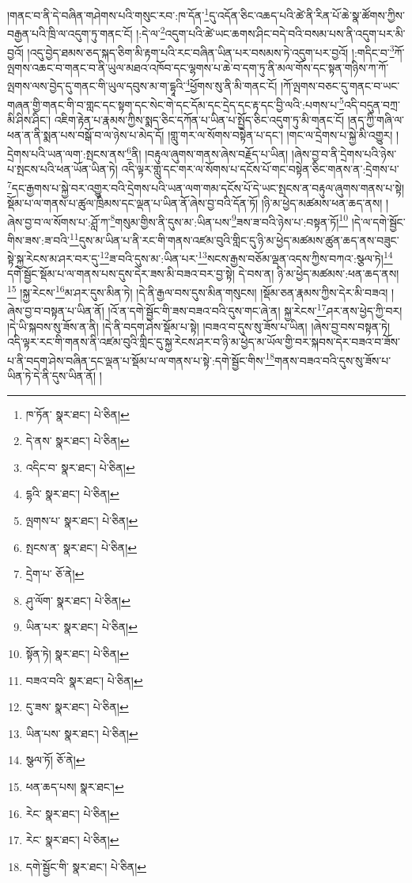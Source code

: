 །གནང་བ་ནི་དེ་བཞིན་གཤེགས་པའི་གསུང་རབ་:ཁ་དོན་\footnote{ཁ་ཏོན་  སྣར་ཐང་།  པེ་ཅིན། }དུ་འདོན་ཅིང་འཆད་པའི་ཚེ་ནི་རིན་པོ་ཆེ་སྣ་ཚོགས་ཀྱིས་བརྒྱན་པའི་ཁྲི་ལ་འདུག་ཏུ་གནང་ངོ། །:དེ་ལ་\footnote{དེ་ནས་  སྣར་ཐང་།  པེ་ཅིན། }འདུག་པའི་ཚེ་ཡང་ཆགས་ཤིང་བདེ་བའི་བསམ་པས་ནི་འདུག་པར་མི་བྱའོ། །འདུ་བྱེད་ཐམས་ཅད་སྐད་ཅིག་མི་རྟག་པའི་རང་བཞིན་ཡིན་པར་བསམས་ཏེ་འདུག་པར་བྱའོ། །:གདིང་བ་\footnote{འདིང་བ་  སྣར་ཐང་།  པེ་ཅིན། }ཀོ་ལྤགས་འཆང་བ་གནང་བ་ནི་ཡུལ་མཐའ་འཁོབ་དང་ལྷགས་པ་ཆེ་བ་དག་ཏུ་ནི་མལ་གོས་དང་སྟན་གཉིས་ཀ་ཀོ་ལྤགས་ལས་བྱེད་དུ་གནང་གི་ཡུལ་དབུས་མ་ག་དྷཱའི་\footnote{དྷའི་  སྣར་ཐང་།  པེ་ཅིན། }ཕྱོགས་སུ་ནི་མི་གནང་ངོ། །ཀོ་ལྤགས་བཅང་དུ་གནང་བ་ཡང་གཞན་གྱི་གནང་གི་བ་གླང་དང་སྟག་དང་སེང་གེ་དང་དོམ་དང་དྲེད་དང་རྟ་དང་བྱི་ལའི་:པགས་པ་\footnote{ལྤགས་པ་  སྣར་ཐང་།  པེ་ཅིན། }འདི་བདུན་བཀྲ་མི་ཤིས་ཤིང་། འཇིག་རྟེན་པ་རྣམས་ཀྱིས་སྨད་ཅིང་དཀོན་པ་ཡིན་པ་སྤྱོད་ཅིང་འདུག་ཏུ་མི་གནང་ངོ། །ནད་ཀྱི་གཞི་ལ་ཕན་ན་ནི་སྨན་པས་བསྒོ་བ་ལ་ཉེས་པ་མེད་དོ། །གླུ་གར་ལ་སོགས་བསྟེན་པ་དང་། །གང་ལ་དྲེགས་པ་སྐྱེ་མི་འགྱུར། །དྲེགས་པའི་ཡན་ལག་:སྤངས་ནས་\footnote{སྤངས་ན་  སྣར་ཐང་།  པེ་ཅིན། }ནི། །བརྟུལ་ཞུགས་གནས་ཞེས་བརྗོད་པ་ཡིན། །ཞེས་བྱ་བ་ནི་དྲེགས་པའི་ཉེས་པ་སྤངས་པའི་ཕན་ཡོན་ཡིན་ཏེ། འདི་ལྟར་གླུ་དང་གར་ལ་སོགས་པ་དངོས་པོ་གང་བསྟེན་ཅིང་གནས་ན་:དྲེགས་པ་\footnote{དྲེག་པ་  ཅོ་ནེ། }དང་རྒྱགས་པ་སྐྱེ་བར་འགྱུར་བའི་དྲེགས་པའི་ཡན་ལག་གམ་དངོས་པོ་དེ་ཡང་སྤངས་ན་བརྟུལ་ཞུགས་གནས་པ་སྟེ། སྡོམ་པ་ལ་གནས་པ་ཚུལ་ཁྲིམས་དང་ལྡན་པ་ཡིན་ནོ་ཞེས་བྱ་བའི་དོན་ཏོ། །ཉི་མ་ཕྱེད་མཚམས་ཕན་ཆད་ནས། །ཞེས་བྱ་བ་ལ་སོགས་པ་:ཤློ་ཀ་\footnote{ཤུ་ལོག་  སྣར་ཐང་།  པེ་ཅིན། }གསུམ་གྱིས་ནི་དུས་མ་:ཡིན་པས་\footnote{ཡིན་པར་  སྣར་ཐང་།  པེ་ཅིན། }ཟས་ཟ་བའི་ཉེས་པ་:བསྟན་ཏོ།\footnote{སྟོན་ཏེ།  སྣར་ཐང་།  པེ་ཅིན། } །དེ་ལ་དགེ་སྦྱོང་གིས་ཟས་:ཟ་བའི་\footnote{བཟའ་བའི་  སྣར་ཐང་།  པེ་ཅིན། }དུས་མ་ཡིན་པ་ནི་རང་གི་གནས་འཛམ་བུའི་གླིང་དུ་ཉི་མ་ཕྱེད་མཚམས་ཚུན་ཆད་ནས་བཟུང་སྟེ་སྐྱ་རེངས་མ་ཤར་བར་དུ་\footnote{དུ་ཟས་  སྣར་ཐང་།  པེ་ཅིན། }ཟ་བའི་དུས་མ་:ཡིན་པར་\footnote{ཡིན་པས་  སྣར་ཐང་།  པེ་ཅིན། }སངས་རྒྱས་བཅོམ་ལྡན་འདས་ཀྱིས་བཀའ་:སྩལ་ཏེ།\footnote{སྩལ་ཏོ།  ཅོ་ནེ། } དགེ་སྦྱོང་སྡོམ་པ་ལ་གནས་པས་དུས་དེར་ཟས་མི་བཟའ་བར་བྱ་སྟེ། དེ་བས་ན། ཉི་མ་ཕྱེད་མཚམས་:ཕན་ཆད་ནས།\footnote{ཕན་ཆད་པས།  སྣར་ཐང་། } །སྐྱ་རེངས་\footnote{རེང་  སྣར་ཐང་།  པེ་ཅིན། }མ་ཤར་དུས་མིན་ཏེ། །དེ་ནི་རྒྱལ་བས་དུས་མིན་གསུངས། །སྡོམ་ཅན་རྣམས་ཀྱིས་དེར་མི་བཟའ། །ཞེས་བྱ་བ་བསྟན་པ་ཡིན་ནོ། །འོ་ན་དགེ་སྦྱོང་གི་ཟས་བཟའ་བའི་དུས་གང་ཞེ་ན། སྐྱ་རེངས་\footnote{རེང་  སྣར་ཐང་།  པེ་ཅིན། }ཤར་ནས་ཕྱེད་ཀྱི་བར། །དེ་ཡི་སྐབས་སུ་ཟོས་ན་ནི། །དེ་ནི་བདག་ཤེས་སྡོམ་པ་སྟེ། །བཟའ་བ་དུས་སུ་ཟོས་པ་ཡིན། །ཞེས་བྱ་བས་བསྟན་ཏེ། འདི་ལྟར་རང་གི་གནས་ནི་འཛམ་བུའི་གླིང་དུ་སྐྱ་རེངས་ཤར་བ་ཉི་མ་ཕྱེད་མ་ཡོལ་གྱི་བར་སྐབས་དེར་བཟའ་བ་ཟོས་པ་ནི་བདག་ཤེས་བཞིན་དང་ལྡན་པ་སྡོམ་པ་ལ་གནས་པ་སྟེ་:དགེ་སྦྱོང་གིས་\footnote{དགེ་སྦྱོང་གི་  སྣར་ཐང་།  པེ་ཅིན། }གནས་བཟའ་བའི་དུས་སུ་ཟོས་པ་ཡིན་ཏེ་དེ་ནི་དུས་ཡིན་ནོ། །
